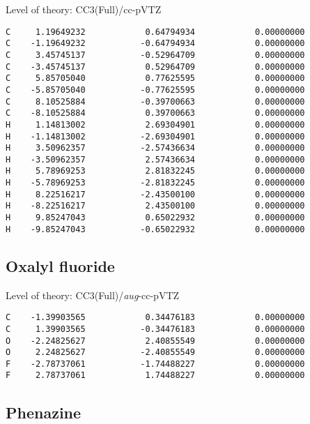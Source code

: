 \documentclass[journal=jctcce,manuscript=article,layout=traditional]{achemso}
\newcommand{\TZ}{cc-pVTZ}
\newcommand{\AVTZ}{\emph{aug}-cc-pVTZ}
\begin{document}
\begin{singlespace}
Level of theory: CC3(Full)/{\TZ}
\begin{verbatim}
C     1.19649232            0.64794934            0.00000000
C    -1.19649232           -0.64794934            0.00000000
C     3.45745137           -0.52964709            0.00000000
C    -3.45745137            0.52964709            0.00000000
C     5.85705040            0.77625595            0.00000000
C    -5.85705040           -0.77625595            0.00000000
C     8.10525884           -0.39700663            0.00000000
C    -8.10525884            0.39700663            0.00000000
H     1.14813002            2.69304901            0.00000000
H    -1.14813002           -2.69304901            0.00000000
H     3.50962357           -2.57436634            0.00000000
H    -3.50962357            2.57436634            0.00000000
H     5.78969253            2.81832245            0.00000000
H    -5.78969253           -2.81832245            0.00000000
H     8.22516217           -2.43500100            0.00000000
H    -8.22516217            2.43500100            0.00000000
H     9.85247043            0.65022932            0.00000000
H    -9.85247043           -0.65022932            0.00000000
\end{verbatim}
\end{singlespace}

\subsection*{Oxalyl fluoride}

\begin{singlespace}
Level of theory: CC3(Full)/{\AVTZ}
\begin{verbatim}
C    -1.39903565            0.34476183            0.00000000
C     1.39903565           -0.34476183            0.00000000
O    -2.24825627            2.40855549            0.00000000
O     2.24825627           -2.40855549            0.00000000
F    -2.78737061           -1.74488227            0.00000000
F     2.78737061            1.74488227            0.00000000
\end{verbatim}
\end{singlespace}

\subsection*{Phenazine}
\end{document}
